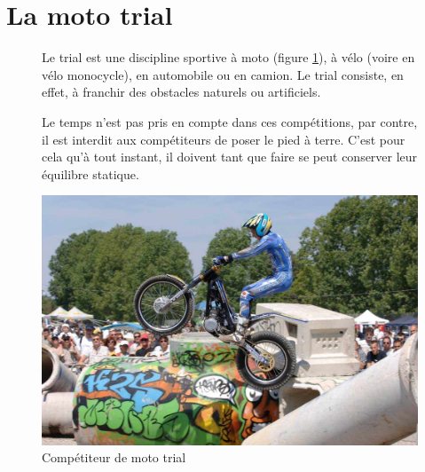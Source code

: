 

\section{La moto trial}

\begin{figure}[!h]
\begin{minipage}{0.4\linewidth}
Le trial est une discipline sportive à moto (figure \ref{img1}), à vélo (voire en vélo monocycle), en automobile ou en camion. Le trial consiste, en effet, à franchir des obstacles naturels ou artificiels.

Le temps n'est pas pris en compte dans ces compétitions, par contre, il est interdit aux compétiteurs de poser le pied à terre. C'est pour cela qu'à tout instant, il doivent tant que faire se peut conserver leur équilibre statique.
\end{minipage}
\hfill
\begin{minipage}{0.5\linewidth}
 \begin{center}
 \includegraphics[width=0.7\linewidth]{img/Trial.jpg}
 \end{center}
 \caption{Compétiteur de moto trial}
 \label{img1}
 \end{minipage}
\end{figure}

